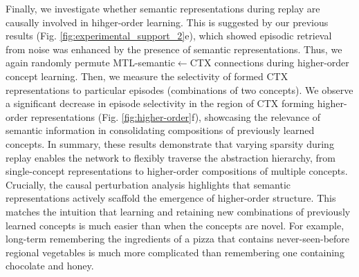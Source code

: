 \documentclass{article}
\begin{document}
\newline\newline
Finally, we investigate whether semantic representations during replay are causally involved in hihger-order learning. This is suggested by our previous results (Fig. \ref{fig:experimental_support_2}e), which showed episodic retrieval from noise was enhanced by the presence of semantic representations. Thus, we again randomly permute MTL-semantic$\leftarrow$CTX connections during higher-order concept learning. Then, we measure the selectivity of formed CTX representations to particular episodes (combinations of two concepts). We observe a significant decrease in episode selectivity in the region of CTX forming higher-order representations (Fig. \ref{fig:higher-order}f), showcasing the relevance of semantic information in consolidating compositions of previously learned concepts.
\newline\newline
In summary, these results demonstrate that varying sparsity during replay enables the network to flexibly traverse the abstraction hierarchy, from single-concept representations to higher-order compositions of multiple concepts. Crucially, the causal perturbation analysis highlights that semantic representations actively scaffold the emergence of higher-order structure. This matches the intuition that learning and retaining new combinations of previously learned concepts is much easier than when the concepts are novel. For example, long-term remembering the ingredients of a pizza that contains never-seen-before regional vegetables is much more complicated than remembering one containing chocolate and honey.
\end{document}
